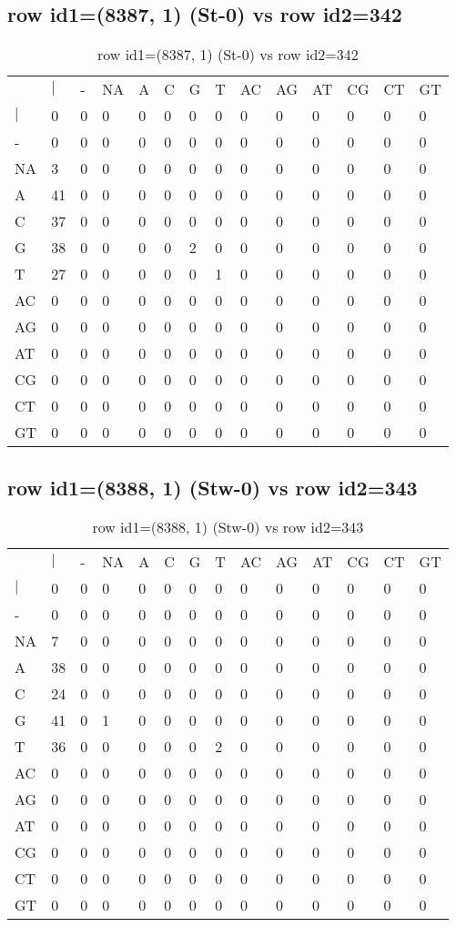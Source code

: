 \subsection{row id1=(8387, 1) (St-0) vs row id2=342}
\begin{center}
\begin{longtable}{|l|l|l|l|l|l|l|l|l|l|l|l|l|l|}
\caption{row id1=(8387, 1) (St-0) vs row id2=342} \label{table_dm434}\\
\hline
\\
\hline
&$|$&-&NA&A&C&G&T&AC&AG&AT&CG&CT&GT\\
$|$&0&0&0&0&0&0&0&0&0&0&0&0&0\\
-&0&0&0&0&0&0&0&0&0&0&0&0&0\\
NA&3&0&0&0&0&0&0&0&0&0&0&0&0\\
A&41&0&0&0&0&0&0&0&0&0&0&0&0\\
C&37&0&0&0&0&0&0&0&0&0&0&0&0\\
G&38&0&0&0&0&2&0&0&0&0&0&0&0\\
T&27&0&0&0&0&0&1&0&0&0&0&0&0\\
AC&0&0&0&0&0&0&0&0&0&0&0&0&0\\
AG&0&0&0&0&0&0&0&0&0&0&0&0&0\\
AT&0&0&0&0&0&0&0&0&0&0&0&0&0\\
CG&0&0&0&0&0&0&0&0&0&0&0&0&0\\
CT&0&0&0&0&0&0&0&0&0&0&0&0&0\\
GT&0&0&0&0&0&0&0&0&0&0&0&0&0\\
\hline
\end{longtable}
\end{center}

\subsection{row id1=(8388, 1) (Stw-0) vs row id2=343}
\begin{center}
\begin{longtable}{|l|l|l|l|l|l|l|l|l|l|l|l|l|l|}
\caption{row id1=(8388, 1) (Stw-0) vs row id2=343} \label{table_dm436}\\
\hline
\\
\hline
&$|$&-&NA&A&C&G&T&AC&AG&AT&CG&CT&GT\\
$|$&0&0&0&0&0&0&0&0&0&0&0&0&0\\
-&0&0&0&0&0&0&0&0&0&0&0&0&0\\
NA&7&0&0&0&0&0&0&0&0&0&0&0&0\\
A&38&0&0&0&0&0&0&0&0&0&0&0&0\\
C&24&0&0&0&0&0&0&0&0&0&0&0&0\\
G&41&0&1&0&0&0&0&0&0&0&0&0&0\\
T&36&0&0&0&0&0&2&0&0&0&0&0&0\\
AC&0&0&0&0&0&0&0&0&0&0&0&0&0\\
AG&0&0&0&0&0&0&0&0&0&0&0&0&0\\
AT&0&0&0&0&0&0&0&0&0&0&0&0&0\\
CG&0&0&0&0&0&0&0&0&0&0&0&0&0\\
CT&0&0&0&0&0&0&0&0&0&0&0&0&0\\
GT&0&0&0&0&0&0&0&0&0&0&0&0&0\\
\hline
\end{longtable}
\end{center}

